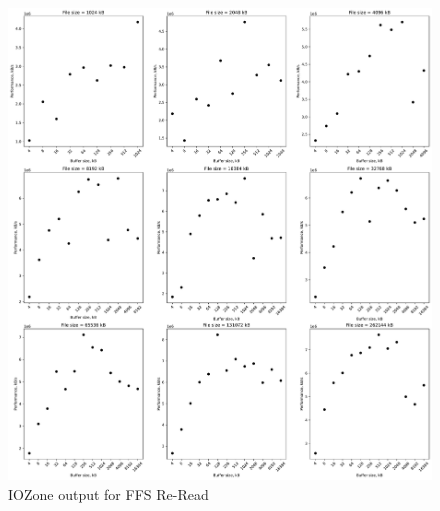 \begin{figure}[!htb]
	\label{fig:bench_ffs_re_read}
	\begin{center}
		\includegraphics[width=1.0\textwidth]{figures/benchmarking/ffs/Re-Read.pdf}
	\end{center}
	\caption{IOZone output for FFS \mbox{Re-Read}}
\end{figure}

